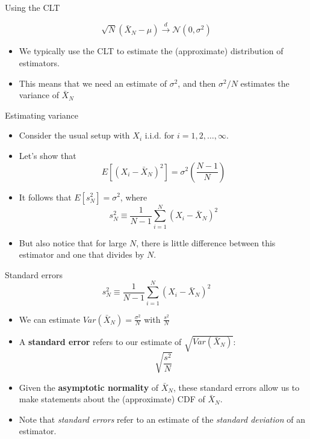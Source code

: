 \begin{frame}{Using the CLT}

	\[
		\sqrt{N} \left( \bar{X}_N  - \mu\right) \overset{d}{\rightarrow} \mathcal{N}\left(0,\sigma^2\right) 
	\]

\begin{itemize}
	\item We typically use the CLT to estimate the (approximate) distribution of estimators.

	\medskip
	\item This means that we need an estimate of $\sigma^2$, and then $\sigma^2/N$ estimates
			the variance of $\bar{X}_N$

\end{itemize}
\end{frame}





\begin{frame}{Estimating variance}
\begin{itemize}
	\item Consider the usual setup with $X_i$ i.i.d. for $i=1,2,\dots,\infty$.

	\medskip
	\item Let's show that \[
			E\left[\left(X_i - \bar{X}_N \right)^2\right] = \sigma^2 \left(\frac{N-1}{N}\right)
		\]

	\medskip
	\item It follows that $E\left[s_N^2 \right] = \sigma^2$, where\[
s_N^2 \equiv \frac{1}{N-1}\sum_{i=1}^{N} \left(X_i - \bar{X}_N \right)^2
\]

	\medskip
	\item But also notice that for large $N$, there is little difference between this estimator and one that divides by $N$.

\end{itemize}
\end{frame}



\begin{frame}{Standard errors}
\[
s_N^2 \equiv \frac{1}{N-1}\sum_{i=1}^{N} \left(X_i - \bar{X}_N \right)^2
\]
\begin{itemize}
	\item We can estimate $Var\left(\bar{X}_N\right)=\frac{\sigma^2}{N}$ with $\frac{s^2}{N}$


	\item A {\bf standard error} refers to our estimate of $\sqrt{Var\left( \bar{X}_N \right)}$:\[
		\sqrt{\frac{s^2}{N}}
\]

	\item Given the {\bf asymptotic normality} of $\bar{X}_N$, these standard errors allow us to
			make statements about the (approximate) CDF of $\bar{X}_N$.
	

	\item Note that \emph{standard errors} refer to an estimate of the \emph{standard deviation}
			of an estimator.
\end{itemize}
\end{frame}





